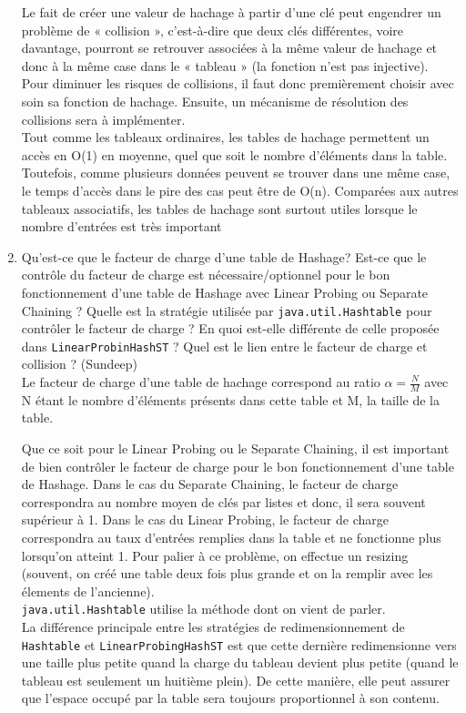 \documentclass[11pt]{article}
\begin{document}
\begin{enumerate}
Le fait de créer une valeur de hachage à partir d'une clé peut engendrer un problème de « collision », c'est-à-dire que deux clés différentes, voire davantage, pourront se retrouver associées à la même valeur de hachage et donc à la même case dans le « tableau » (la fonction n'est pas injective). Pour diminuer les risques de collisions, il faut donc premièrement choisir avec soin sa fonction de hachage. Ensuite, un mécanisme de résolution des collisions sera à implémenter.\\
Tout comme les tableaux ordinaires, les tables de hachage permettent un accès en O(1) en moyenne, quel que soit le nombre d'éléments dans la table. Toutefois, comme plusieurs données peuvent se trouver dans une même case, le temps d'accès dans le pire des cas peut être de O(n). Comparées aux autres tableaux associatifs, les tables de hachage sont surtout utiles lorsque le nombre d'entrées est très important





\item Qu'est-ce que le facteur de charge d'une table de Hashage? Est-ce que le contrôle du facteur de charge est nécessaire/optionnel pour le bon fonctionnement d'une table de Hashage avec Linear Probing ou Separate Chaining ? Quelle est la stratégie utilisée par \texttt{java.util.Hashtable} pour contrôler le facteur de charge ? En quoi est-elle différente de celle proposée dans \texttt{LinearProbinHashST} ? Quel est le lien entre le facteur de charge et collision ? (Sundeep) \\


Le facteur de charge d'une table de hachage correspond au ratio $\alpha = \frac{N}{M} $  avec N étant le nombre d'éléments présents dans cette table et M, la taille de la table. 

Que ce soit pour le Linear Probing ou le Separate Chaining, il est important de bien contrôler le facteur de charge pour le bon fonctionnement d'une table de Hashage. Dans le cas du Separate Chaining, le facteur de charge correspondra au nombre moyen de clés par listes et donc, il sera souvent supérieur à 1. Dans le cas du Linear Probing, le facteur de charge correspondra au taux d'entrées remplies dans la table et ne fonctionne plus lorsqu'on atteint 1. Pour palier à ce problème, on effectue un resizing (souvent, on créé une table deux fois plus grande et on la remplir avec les élements de l'ancienne). \\
\texttt{java.util.Hashtable} utilise la méthode dont on vient de parler.\\
La différence principale entre les stratégies de redimensionnement de \texttt{Hashtable} et \texttt{LinearProbingHashST} est que cette dernière redimensionne vers une taille plus petite quand la charge du tableau devient plus petite (quand le tableau est seulement un huitième plein). De cette manière, elle peut assurer que l'espace occupé par la table sera toujours proportionnel à son contenu.



\end{enumerate}
\end{document}

